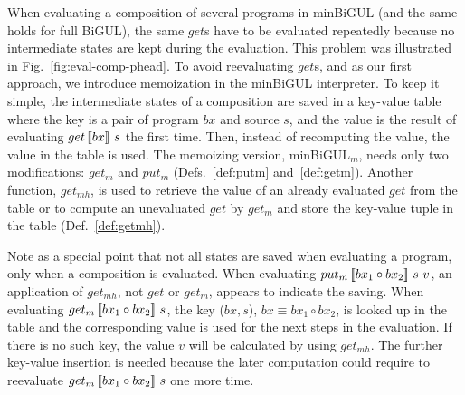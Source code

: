 When evaluating a composition of several programs in minBiGUL (and the same holds for full BiGUL), the same $get$s have to be evaluated repeatedly because no intermediate states are kept during the evaluation. This problem was illustrated in Fig.~\ref{fig:eval-comp-phead}. To avoid reevaluating $get$s, and as our first approach, we introduce memoization in the minBiGUL interpreter.
To keep it simple, the intermediate states of a composition are saved in a key-value table where the key is a pair of program $bx$ and source $s$, and the value is the result of evaluating $get \, [\![bx]\!] \ s$ the first time. Then, instead of recomputing the value, the value in the table is used. The memoizing version, minBiGUL$_m$, needs only two modifications: $get_m$ and $put_m$ (Defs.~\ref{def:putm} and~\ref{def:getm}). Another function, $get_{mh}$, is used to retrieve the value of an already evaluated $get$ from the table or to compute an unevaluated $get$ by $get_m$ and store the key-value tuple in the table (Def.~\ref{def:getmh}).

Note as a special point that not all states are saved when evaluating a program, only when a composition is evaluated. When evaluating $put_m \, [\![bx_1 \circ bx_2]\!] \ s \ v$, an application of $get_{mh}$, not $get$ or $get_m$, appears to indicate the saving. When evaluating $get_m \, [\![bx_1 \circ bx_2]\!] \ s$, the key ($bx,s$), $bx \equiv bx_1 \circ bx_2$, is looked up in the table and the corresponding value is used for the next steps in the evaluation. If there is no such key, the value $v$ will be calculated by using $get_{mh}$. The further key-value insertion is needed because the later computation could require to reevaluate $get_m \, [\![bx_1 \circ bx_2]\!] \ s$ one more time.
